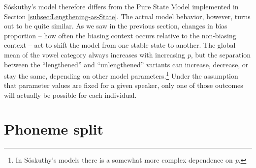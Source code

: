 Sóskuthy's model therefore differs from the Pure State Model implemented
in Section \ref{subsec:Lengthening-as-State}. The actual model behavior,
however, turns out to be quite similar. As we saw in the previous
section, changes in bias proportion – how often the biasing context
occurs relative to the non-biasing context – act to shift the model
from one stable state to another. The global mean of the vowel category
always increases with increasing \emph{p}, but the separation between
the ``lengthened'' and ``unlengthened'' variants can increase, decrease,
or stay the same, depending on other model parameters.\footnote{In Sóskuthy's models there is a somewhat more complex dependence on
\emph{p}. } Under the assumption that parameter values are fixed for a given
speaker, only one of those outcomes will actually be possible for
each individual. 

\section{\label{subsec:Phoneme-Split}Phoneme split}

